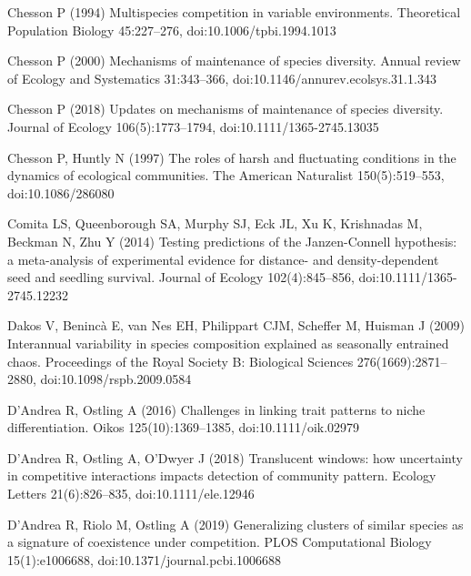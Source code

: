 \documentclass[a4paper,12pt]{article}
\begin{document}
\begin{thebibliography}{68}
Chesson P (1994) Multispecies competition in variable environments.
  Theoretical Population Biology 45:227--276, doi:{10.1006/tpbi.1994.1013}

Chesson P (2000) Mechanisms of maintenance of species diversity. Annual review
  of Ecology and Systematics 31:343--366,
  doi:{10.1146/annurev.ecolsys.31.1.343}

Chesson P (2018) Updates on mechanisms of maintenance of species diversity.
  Journal of Ecology 106(5):1773--1794, doi:{10.1111/1365-2745.13035}

Chesson P, Huntly N (1997) The roles of harsh and fluctuating conditions in the
  dynamics of ecological communities. The American Naturalist 150(5):519--553,
  doi:{10.1086/286080}

Comita LS, Queenborough SA, Murphy SJ, Eck JL, Xu K, Krishnadas M, Beckman N,
  Zhu Y (2014) {Testing predictions of the Janzen-Connell hypothesis: a
  meta-analysis of experimental evidence for distance- and density-dependent
  seed and seedling survival}. Journal of Ecology 102(4):845--856,
  doi:{10.1111/1365-2745.12232}

Dakos V, Beninc\`{a} E, van Nes EH, Philippart CJM, Scheffer M, Huisman J
  (2009) Interannual variability in species composition explained as seasonally
  entrained chaos. Proceedings of the Royal Society B: Biological Sciences
  276(1669):2871--2880, doi:{10.1098/rspb.2009.0584}

D'Andrea R, Ostling A (2016) Challenges in linking trait patterns to niche
  differentiation. Oikos 125(10):1369--1385, doi:{10.1111/oik.02979}

D'Andrea R, Ostling A, O'Dwyer J (2018) Translucent windows: how uncertainty in
  competitive interactions impacts detection of community pattern. Ecology
  Letters 21(6):826--835, doi:{10.1111/ele.12946}

D'Andrea R, Riolo M, Ostling A (2019) Generalizing clusters of similar species
  as a signature of coexistence under competition. PLOS Computational Biology
  15(1):e1006688, doi:{10.1371/journal.pcbi.1006688}


\end{thebibliography}
\end{document}

